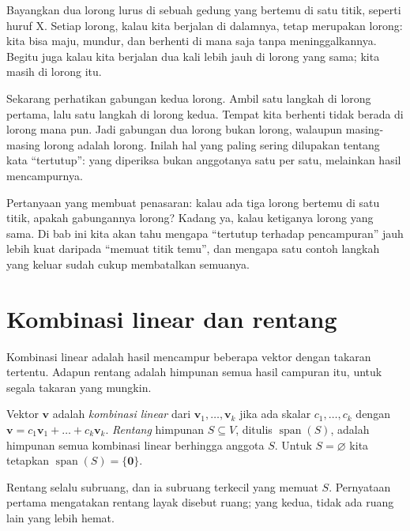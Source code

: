 
\begin{untukanak}
Bayangkan dua lorong lurus di sebuah gedung yang bertemu di satu titik, seperti huruf X.
Setiap lorong, kalau kita berjalan di dalamnya, tetap merupakan lorong: kita bisa maju,
mundur, dan berhenti di mana saja tanpa meninggalkannya. Begitu juga kalau kita berjalan
dua kali lebih jauh di lorong yang sama; kita masih di lorong itu.

Sekarang perhatikan gabungan kedua lorong. Ambil satu langkah di lorong pertama, lalu satu
langkah di lorong kedua. Tempat kita berhenti tidak berada di lorong mana pun. Jadi gabungan
dua lorong bukan lorong, walaupun masing-masing lorong adalah lorong. Inilah hal yang paling
sering dilupakan tentang kata ``tertutup'': yang diperiksa bukan anggotanya satu per satu,
melainkan hasil mencampurnya.

Pertanyaan yang membuat penasaran: kalau ada tiga lorong bertemu di satu titik, apakah
gabungannya lorong? Kadang ya, kalau ketiganya lorong yang sama. Di bab ini kita akan tahu
mengapa ``tertutup terhadap pencampuran'' jauh lebih kuat daripada ``memuat titik temu'', dan
mengapa satu contoh langkah yang keluar sudah cukup membatalkan semuanya.
\end{untukanak}

\section{Kombinasi linear dan rentang}

Kombinasi linear adalah hasil mencampur beberapa vektor dengan takaran tertentu. Adapun
rentang adalah himpunan semua hasil campuran itu, untuk segala takaran yang mungkin.

\begin{definisi}
Vektor $\mathbf{v}$ adalah \emph{kombinasi linear} dari
$\mathbf{v}_{1},\dots,\mathbf{v}_{k}$ jika ada skalar $c_{1},\dots,c_{k}$ dengan
$\mathbf{v}=c_{1}\mathbf{v}_{1}+\dots+c_{k}\mathbf{v}_{k}$. \emph{Rentang} himpunan
$S\subseteq V$, ditulis $\operatorname{span}(S)$, adalah himpunan semua kombinasi linear
berhingga anggota $S$. Untuk $S=\varnothing$ kita tetapkan
$\operatorname{span}(S)=\{\mathbf{0}\}$.
\end{definisi}

Rentang selalu subruang, dan ia subruang terkecil yang memuat $S$. Pernyataan pertama
mengatakan rentang layak disebut ruang; yang kedua, tidak ada ruang lain yang lebih hemat.

